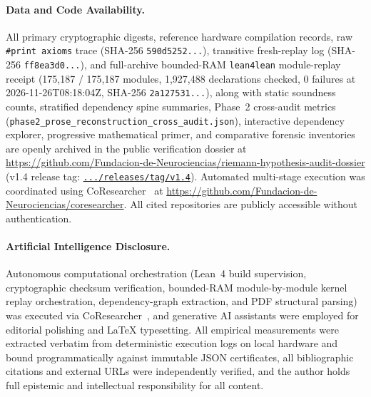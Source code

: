 \documentclass[11pt,a4paper]{article}
\begin{document}
\paragraph{Data and Code Availability.} All primary cryptographic digests, reference hardware compilation records, raw \texttt{\#print axioms} trace (SHA-256 \texttt{590d5252...}), transitive fresh-replay log (SHA-256 \texttt{ff8ea3d0...}), and full-archive bounded-RAM \texttt{lean4lean} module-replay receipt (175,187 / 175,187 modules, 1,927,488 declarations checked, 0 failures at 2026-11-26T08:18:04Z, SHA-256 \texttt{2a127531...}), along with static soundness counts, stratified dependency spine summaries, Phase~2 cross-audit metrics (\texttt{phase2\_prose\_reconstruction\_cross\_audit.json}), interactive dependency explorer, progressive mathematical primer, and comparative forensic inventories are openly archived in the public verification dossier at \url{https://github.com/Fundacion-de-Neurociencias/riemann-hypothesis-audit-dossier} (v1.4 release tag: \href{https://github.com/Fundacion-de-Neurociencias/riemann-hypothesis-audit-dossier/releases/tag/v1.4}{\texttt{.../releases/tag/v1.4}}). Automated multi-stage execution was coordinated using CoResearcher~\cite{menendez2026coresearcher} at \url{https://github.com/Fundacion-de-Neurociencias/coresearcher}. All cited repositories are publicly accessible without authentication.

\paragraph{Artificial Intelligence Disclosure.} Autonomous computational orchestration (Lean~4 build supervision, cryptographic checksum verification, bounded-RAM module-by-module kernel replay orchestration, dependency-graph extraction, and PDF structural parsing) was executed via CoResearcher~\cite{menendez2026coresearcher}, and generative AI assistants were employed for editorial polishing and \LaTeX{} typesetting. All empirical measurements were extracted verbatim from deterministic execution logs on local hardware and bound programmatically against immutable JSON certificates, all bibliographic citations and external URLs were independently verified, and the author holds full epistemic and intellectual responsibility for all content.

{\footnotesize
\setlength{\itemsep}{2pt}


}
\end{document}
